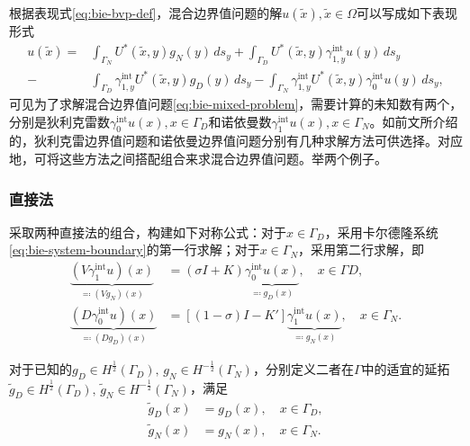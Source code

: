 根据表现式\eqref{eq:bie-bvp-def}，混合边界值问题的解$u(\widetilde{x}), \widetilde{x} \in \Omega$可以写成如下表现形式
\begin{equation}
  \label{eq:bie-mbvp-def}
  \begin{split}
    u(\widetilde{x}) = & \int_{\Gamma_{N}} U^{*}(\widetilde{x}, y) g_{N}(y) \, d s_{y}
    +  \int_{\Gamma_{D}} U^{*}(\widetilde{x},y) \gamma_{1,y}^{\text{int}} u(y) \, d s_{y} \\
    - & \int_{\Gamma_{D}} \gamma_{1,y}^{\text{int}} U^{*}(\widetilde{x}, y) g_{D}(y) \, d s_{y}
    - \int_{\Gamma_{N}} \gamma_{1,y}^{\text{int}} U^{*}(\widetilde{x}, y) \gamma_{0}^{\text{int}} u(y) \, d s_{y},
  \end{split}
\end{equation}
可见为了求解混合边界值问题\eqref{eq:bie-mixed-problem}，需要计算的未知数有两个，分别是狄利克雷数$\gamma_{0}^{\text{int}} u(x), x \in \Gamma_{D}$和诺依曼数$\gamma_{1}^{\text{int}} u(x), x \in \Gamma_{N}$。如前文所介绍的，狄利克雷边界值问题和诺依曼边界值问题分别有几种求解方法可供选择。对应地，可将这些方法之间搭配组合来求混合边界值问题。举两个例子。

\subsubsection{直接法}
采取两种直接法的组合，构建如下对称公式：对于$x \in \Gamma_{D}$，采用卡尔德隆系统\eqref{eq:bie-system-boundary}的第一行求解；对于$x \in \Gamma_{N}$，采用第二行求解，即
\begin{equation}
  \label{eq:bie-mixed-solution}
  \begin{split}
    \underbrace{
    \left(V \gamma_{1}^{\text{int}} u \right) (x)
    }_{\eqqcolon \left(V g_{N} \right) (x)}
    &=
    \left( \sigma I + K \right)
    \underbrace{
    \gamma_{0}^{\text{int}} u(x)
    }_{\eqqcolon g_{D}(x)}
    , \quad x \in \Gamma{D}, \\
    \underbrace{
    \left( D \gamma_{0}^{\text{int}} u \right)(x)
    }_{\eqqcolon \left(D g_{D} \right)(x)}
    &=
    \left[ \left( 1-\sigma \right) I - K' \right] \underbrace{
    \gamma_{1}^{\text{int}} u(x)
    }_{\eqqcolon g_{N}(x)}
    , \quad x \in \Gamma_{N}.
  \end{split}
\end{equation}

对于已知的$g_{D} \in H^{\frac{1}{2}}(\Gamma_{D}), \,g_{N} \in H^{-\frac{1}{2}}(\Gamma_{N})$，分别定义二者在$\Gamma$中的适宜的延拓$\widetilde{g}_{D} \in H^{\frac{1}{2}}(\Gamma_{D}), \, \widetilde{g}_{N} \in H^{-\frac{1}{2}}(\Gamma_{N})$，满足
\begin{equation*}
  \begin{split}
    \widetilde{g}_{D}(x) & = g_{D}(x), \quad x \in \Gamma_{D}, \\
    \widetilde{g}_{N}(x) & = g_{N}(x), \quad x \in \Gamma_{N}.
  \end{split}
\end{equation*}

